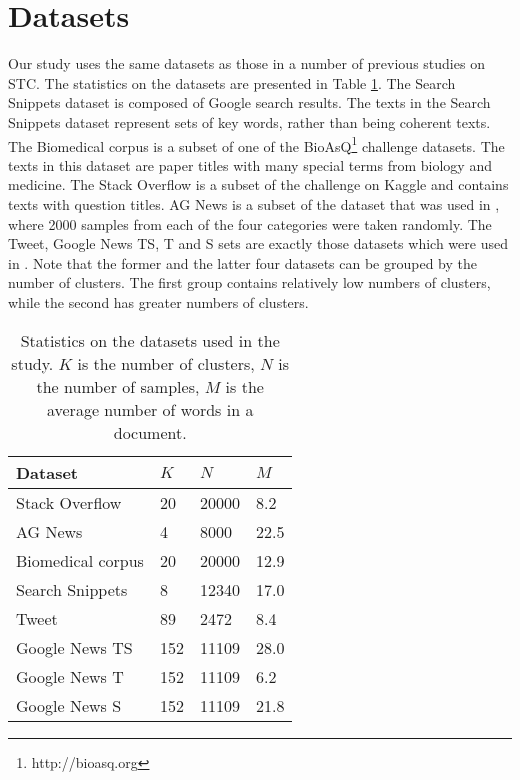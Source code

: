 \documentclass[11pt,a4paper]{article}
\begin{document}
\section{Datasets}
Our study uses the same datasets as those in a number of previous studies \cite{xu2017self,hadifar2019self,rakib2020enhancement} on STC. The statistics on the datasets are presented in Table \ref{statistics}. The Search Snippets dataset is composed of Google search results. The texts in the Search Snippets dataset represent sets of key words, rather than being coherent texts. The Biomedical corpus is a subset of one of the BioAsQ\footnote{http://bioasq.org} challenge datasets. The texts in this dataset are paper titles with many special terms from biology and medicine. The Stack Overflow is a subset of the challenge on Kaggle and contains texts with question titles. AG News is a subset of the dataset that was used in \cite{zhang2015text}, where 2000 samples from each of the four categories were taken randomly. The Tweet, Google News TS, T and S sets are exactly those datasets which were used in \cite{yin2014dirichlet}. Note that the former and the latter four datasets can be grouped by the number of clusters. The first group contains relatively low numbers of clusters, while the second has greater numbers of clusters.  
\begin{table}
\centering
\begin{tabular}{llll}
\hline
\textbf{Dataset} & $K$ & $N$ & $M$ \\
\hline
Stack Overflow & 20 & 20000 & 8.2 \\
\hline
AG News & 4 & 8000 & 22.5 \\
\hline
Biomedical corpus & 20 & 20000 & 12.9 \\
\hline
Search Snippets & 8 & 12340 & 17.0 \\
\hline
Tweet & 89 & 2472 & 8.4 \\
\hline
Google News TS & 152 & 11109 & 28.0 \\
\hline
Google News T & 152 & 11109 & 6.2 \\
\hline
Google News S & 152 & 11109 & 21.8 \\
\hline

\end{tabular}
\caption{Statistics on the datasets used in the study. $K$ is the number of clusters, $N$ is the number of samples, $M$ is the average number of words in a document.}
\label{statistics}
\end{table}
\end{document}
